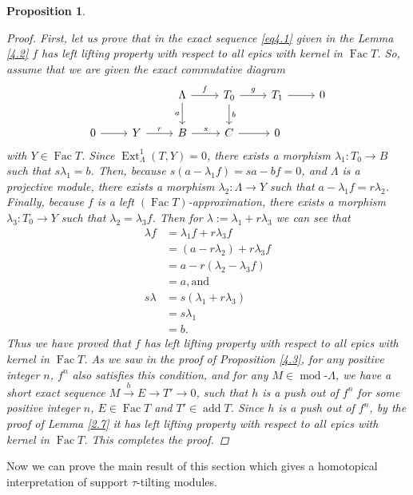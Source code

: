 \documentclass[12pt]{amsart}
\numberwithin{equation}{section}
\newtheorem{proposition}[lemma]{Proposition}
\theoremstyle{definition}
\DeclareMathOperator{\modd}{mod}
\DeclareMathOperator{\add}{add}
\DeclareMathOperator{\Ext}{Ext}
\DeclareMathOperator{\Fac}{Fac}
\newtheorem*{theorem 0*}{Theorem}
\newtheorem*{theorem a*}{Theorem A}
\newtheorem*{theorem b*}{Theorem B}
\newcounter{diagram}
\numberwithin{diagram}{section}
\begin{document}
\begin{proposition}
\begin{proof}
First, let us prove that in the exact sequence \eqref{eq4.1} given in the Lemma \ref{4.2} $f$ has left lifting property with respect to all epics with kernel in $\Fac T$. So, assume that we are given the exact commutative diagram 
\[\begin{tikzcd}
	&& \Lambda & {T_0} & {T_1} & 0 \\
	0 & Y & B & C & 0
	\arrow["f", from=1-3, to=1-4]
	\arrow["a"', from=1-3, to=2-3]
	\arrow["g", from=1-4, to=1-5]
	\arrow["b", from=1-4, to=2-4]
	\arrow[from=1-5, to=1-6]
	\arrow[from=2-1, to=2-2]
	\arrow["r", from=2-2, to=2-3]
	\arrow["s", from=2-3, to=2-4]
	\arrow[from=2-4, to=2-5]
\end{tikzcd}\]
with $Y\in\Fac T$. Since $\Ext_{\Lambda}^1(T,Y)=0$, there exists a morphism $\lambda_1:T_0\rightarrow B$ such that $s\lambda_1=b$.
Then, because $s(a-\lambda_1f)=sa-bf=0$, and $\Lambda$ is a projective module, there exists a morphism $\lambda_2:\Lambda\rightarrow Y$ such that $a-\lambda_1f=r\lambda_2$.
Finally, because $f$ is a left $(\Fac T)$-approximation, there exists a morphism $\lambda_3:T_0\rightarrow Y$ such that
$\lambda_2=\lambda_3f$. Then for $\lambda:=\lambda_1+r\lambda_3$ we can see that
\begin{align*}
\lambda f&=\lambda_1f+r\lambda_3f\\
              &=(a-r\lambda_2)+r\lambda_3f\\
              &=a-r(\lambda_2-\lambda_3f)\\
              &=a, \text{and}\\
s\lambda &=s(\lambda_1+r\lambda_3)\\
              &=s\lambda_1\\
              &=b.
\end{align*}
Thus we have proved that $f$ has left lifting property with respect to all epics with kernel in $\Fac T$.
As we saw in the proof of Proposition \ref{4.3}, for any positive integer $n$, $f^n$ also satisfies this condition, and for any $M\in\modd\text{-}\Lambda$, we have a short exact sequence $M\overset{h}{\longrightarrow}E\rightarrow T'\rightarrow 0$, such that $h$ is a push out of $f^n$ for some positive integer $n$, $E\in \Fac T$ and $T'\in \add T$.
Since $h$ is a push out of $f^n$, by the proof of Lemma \ref{2.7} it has  left lifting property with respect to all epics with kernel in $\Fac T$. This completes the proof.
\end{proof}
\end{proposition}

Now we can prove the main result of this section which gives a homotopical interpretation of support $\tau$-tilting modules.
\end{document}

